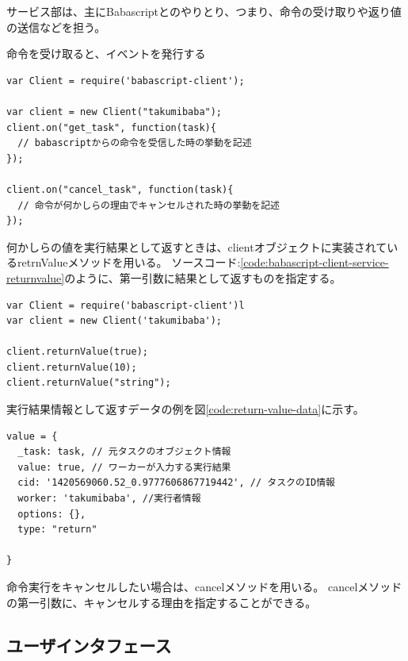 サービス部は、主にBabascriptとのやりとり、つまり、命令の受け取りや返り値の送信などを担う。

命令を受け取ると、イベントを発行する

\begin{lstlisting}[caption=Babascript Agent サービス部のソースコード例, label=code:babascript-client-service]
var Client = require('babascript-client');

var client = new Client("takumibaba");
client.on("get_task", function(task){
  // babascriptからの命令を受信した時の挙動を記述
});

client.on("cancel_task", function(task){
  // 命令が何かしらの理由でキャンセルされた時の挙動を記述
});
\end{lstlisting}

何かしらの値を実行結果として返すときは、clientオブジェクトに実装されているretrnValueメソッドを用いる。
ソースコード:\ref{code:babascript-client-service-returnvalue}のように、第一引数に結果として返すものを指定する。

\begin{lstlisting}[caption=Babascript Agent 処理結果を返すメソッドの例, label=code:babascript-client-service-returnvalue]
var Client = require('babascript-client')l
var client = new Client('takumibaba');

client.returnValue(true);
client.returnValue(10);
client.returnValue("string");
\end{lstlisting}

実行結果情報として返すデータの例を図\ref{code:return-value-data}に示す。

\begin{lstlisting}[caption=タスク情報, label=code:return-value-data]
value = {
  _task: task, // 元タスクのオブジェクト情報
  value: true, // ワーカーが入力する実行結果
  cid: '1420569060.52_0.9777606867719442', // タスクのID情報
  worker: 'takumibaba', //実行者情報
  options: {},
  type: "return"

}
\end{lstlisting}

命令実行をキャンセルしたい場合は、cancelメソッドを用いる。
cancelメソッドの第一引数に、キャンセルする理由を指定することができる。

\subsection{ユーザインタフェース}\label{ux30e6ux30fcux30b6ux30a4ux30f3ux30bfux30d5ux30a7ux30fcux30b9}

